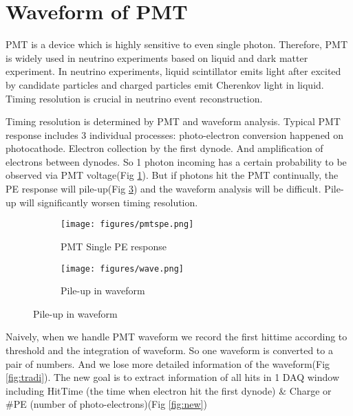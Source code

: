 \section{Waveform of PMT} %
PMT is a device which is highly sensitive to even single photon. Therefore, PMT is widely used in neutrino experiments based on liquid and dark matter experiment. In neutrino experiments, liquid scintillator emits light after excited by candidate particles and charged particles emit Cherenkov light in liquid. Timing resolution is crucial in neutrino event reconstruction. 

Timing resolution is determined by PMT and waveform analysis. Typical PMT response includes 3 individual processes: photo-electron conversion happened on photocathode. Electron collection by the first dynode. And amplification of electrons between dynodes. So 1 photon incoming has a certain probability to be observed via PMT voltage(Fig \ref{fig:spe}). But if photons hit the PMT continually, the PE response will pile-up(Fig \ref{fig:pile}) and the waveform analysis will be difficult. Pile-up will significantly worsen timing resolution. 

\begin{figure}[H]
\begin{minipage}{.5\textwidth}
\begin{figure}[H]
    \centering
    \caption{PMT Single PE response}
    \texttt{[image: figures/pmtspe.png]}
    \label{fig:spe}
\end{figure}
\end{minipage}
\begin{minipage}{.5\textwidth}
\begin{figure}[H]
    \centering
    \caption{Pile-up in waveform}
    \texttt{[image: figures/wave.png]}
    \label{fig:pile}
\end{figure}
\end{minipage}
\end{figure}

Naively, when we handle PMT waveform we record the first hittime according to threshold and the integration of waveform. So one waveform is converted to a pair of numbers. And we lose more detailed information of the waveform(Fig \ref{fig:tradi}). The new goal is to extract information of all hits in 1 DAQ window including HitTime (the time when electron hit the first dynode) \& Charge or \#PE (number of photo-electrons)(Fig \ref{fig:new})

